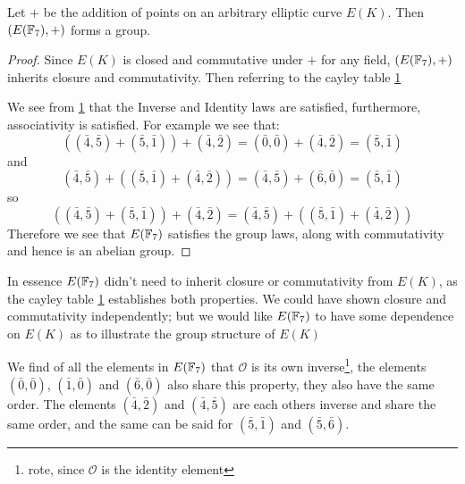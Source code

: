 \begin{theorem}
    Let $+$ be the addition of points on an arbitrary elliptic curve $E(K)$. Then $(E(\mathbb{F}_7),+)$ forms a group.
\end{theorem}
    \begin{proof}
        Since $E(K)$ is closed and commutative under $+$ for any field, $(E(\mathbb{F}_7),+)$ inherits closure and commutativity. Then referring to the cayley table \ref{fig:CayleyTable}
        
        \begin{figure}
            \centering
            
            \caption{}
            \label{fig:CayleyTable}
        \end{figure}
        
We see from \ref{fig:CayleyTable} that the Inverse and Identity laws are satisfied, furthermore, associativity is satisfied. For example we see that:
        \begin{equation*}
            ((\bar{4},\bar{5})+(\bar{5},\bar{1}))+(\bar{4},\bar{2}) = (\bar{0},\bar{0})+(\bar{4},\bar{2})= (\bar{5},\bar{1})
        \end{equation*}
and
        \begin{equation*}
            (\bar{4},\bar{5})+((\bar{5},\bar{1})+(\bar{4},\bar{2})) = (\bar{4},\bar{5})+(\bar{6},\bar{0}) = (\bar{5},\bar{1})
        \end{equation*}
so 
        \begin{equation*}
            ((\bar{4},\bar{5})+(\bar{5},\bar{1}))+(\bar{4},\bar{2}) = (\bar{4},\bar{5})+((\bar{5},\bar{1})+(\bar{4},\bar{2}))
        \end{equation*}
Therefore we see that $E(\mathbb{F}_7)$ satisfies the group laws, along with commutativity and hence is an abelian group.
    \end{proof}
        \begin{remark}
            In essence $E(\mathbb{F}_7)$ didn't need to inherit closure or commutativity from $E(K)$, as the cayley table \ref{fig:CayleyTable} establishes both properties. We could  have shown closure and commutativity independently; but we would like $E(\mathbb{F}_7)$ to have some dependence on $E(K)$ as to illustrate the group structure of $E(K)$
        \end{remark}
        
\hspace{10mm}We find of all the elements in $E(\mathbb{F}_7)$ that $\mathcal{O}$ is its own inverse\footnote{rote, since $\mathcal{O}$ is the identity element}, the elements $(\bar{0},\bar{0})$, $(\bar{1},\bar{0})$ and $(\bar{6},\bar{0})$ also share this property, they also have the same order. The elements $(\bar{4},\bar{2})$ and $(\bar{4},\bar{5})$ are each others inverse and share the same order, and the same can be said for $(\bar{5},\bar{1})$ and $(\bar{5},\bar{6})$.

